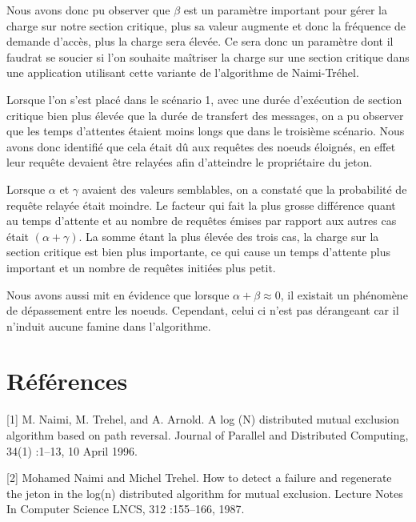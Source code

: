 \documentclass[12pt,a4paper]{article}
\begin{document}
Nous avons donc pu observer que $\beta$ est un paramètre important pour gérer la charge sur notre section critique, plus sa valeur augmente et donc la fréquence de demande d'accès, plus la charge sera élevée. Ce sera donc un paramètre dont il faudrat se soucier si l'on souhaite maîtriser la charge sur une section critique dans une application utilisant cette variante de l'algorithme de Naimi-Tréhel.

Lorsque l'on s'est placé dans le scénario 1, avec une durée d'exécution de section critique bien plus élevée que la durée de transfert des messages, on a pu observer que les temps d'attentes étaient moins longs que dans le troisième scénario. Nous avons donc identifié que cela était dû aux requêtes des noeuds éloignés, en effet leur requête devaient être relayées afin d'atteindre le propriétaire du jeton. 

Lorsque $\alpha$ et $\gamma$ avaient des valeurs semblables, on a constaté que la probabilité de requête relayée était moindre. Le facteur qui fait la plus grosse différence quant au temps d'attente et au nombre de requêtes émises par rapport aux autres cas était $(\alpha + \gamma)$. La somme étant la plus élevée des trois cas, la charge sur la section critique est bien plus importante, ce qui cause un temps d'attente plus important et un nombre de requêtes initiées plus petit.

Nous avons aussi mit en évidence que lorsque $\alpha + \beta \approx 0$, il existait un phénomène de dépassement entre les noeuds. Cependant, celui ci n'est pas dérangeant car il n'induit aucune famine dans l'algorithme. 


\section{Références}

\begingroup %
\setlength{\parindent}{0cm}
[1] M. Naimi, M. Trehel, and A. Arnold. A log (N) distributed mutual exclusion algorithm based
on path reversal. Journal of Parallel and Distributed Computing, 34(1) :1–13, 10 April 1996.

[2] Mohamed Naimi and Michel Trehel. How to detect a failure and regenerate the jeton in the
log(n) distributed algorithm for mutual exclusion. Lecture Notes In Computer Science LNCS,
312 :155–166, 1987.
\endgroup
\end{document}
